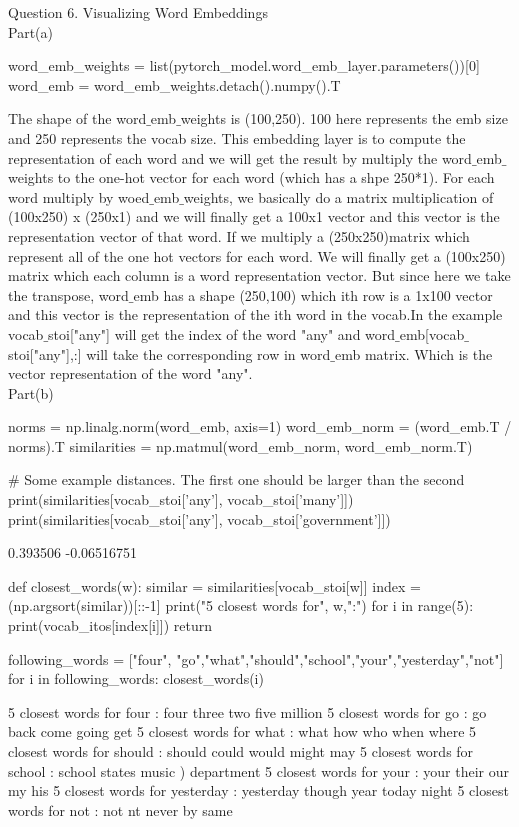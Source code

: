 \documentclass[12pt]{article}
\begin{document}
Question 6. Visualizing Word Embeddings\\

Part(a)\\
\begin{python}
word_emb_weights = list(pytorch_model.word_emb_layer.parameters())[0]
word_emb = word_emb_weights.detach().numpy().T
\end{python}
The shape of the word$\_$emb$\_$weights is (100,250). 100 here represents the emb size and 250
represents the vocab size. This embedding layer is to compute the representation of each word
and we will get the result by multiply the word$\_$emb$\_$weights to the one-hot vector for each
word (which has a shpe 250*1). For each word multiply by woed$\_$emb$\_$weights, we basically do
a matrix multiplication of (100x250) x (250x1) and we will finally get a 100x1 vector and this
vector is the representation vector of that word. If we multiply a (250x250)matrix which
represent all of the one hot vectors for each word. We will finally get a (100x250) matrix which
each column is a word representation vector. But since here we take the transpose, word$\_$emb
has a shape (250,100) which ith row is a 1x100 vector and this vector is the representation of
the ith word in the vocab.In the example vocab$\_$stoi["any"] will get the index of the word "any"
and word$\_$emb[vocab$\_$stoi["any"],:] will take the corresponding row in word$\_$emb matrix.
Which is the vector representation of the word "any".\\

Part(b)\\
\begin{python}
norms = np.linalg.norm(word_emb, axis=1)
word_emb_norm = (word_emb.T / norms).T
similarities = np.matmul(word_emb_norm, word_emb_norm.T)

# Some example distances. The first one should be larger than the second
print(similarities[vocab_stoi['any'], vocab_stoi['many']])
print(similarities[vocab_stoi['any'], vocab_stoi['government']])
\end{python}
\begin{python}
0.393506
-0.06516751
\end{python}
\begin{python}
def closest_words(w):
  similar = similarities[vocab_stoi[w]]
  index = (np.argsort(similar))[::-1]
  print("5 closest words for", w,":")
  for i in range(5):
    print(vocab_itos[index[i]])
  return 
\end{python}
\begin{python}
following_words = ["four", "go","what","should","school","your","yesterday","not"]
for i in following_words:
  closest_words(i)
\end{python}
\begin{python}
5 closest words for four :
four
three
two
five
million
5 closest words for go :
go
back
come
going
get
5 closest words for what :
what
how
who
when
where
5 closest words for should :
should
could
would
might
may
5 closest words for school :
school
states
music
)
department
5 closest words for your :
your
their
our
my
his
5 closest words for yesterday :
yesterday
though
year
today
night
5 closest words for not :
not
nt
never
by
same
\end{python}
\end{document}

